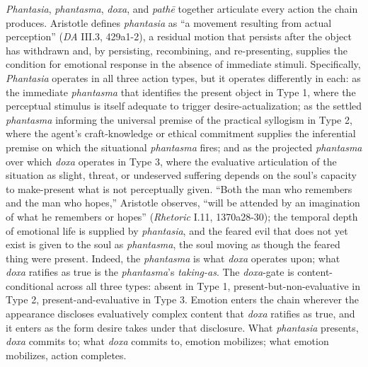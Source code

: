 \documentclass{article}
\begin{document}
\textit{Phantasia}, \textit{phantasma}, \textit{doxa}, and \textit{pathē} together articulate every action the chain produces. Aristotle defines \textit{phantasia} as ``a movement resulting from actual perception'' (\textit{DA} III.3, 429a1-2), a residual motion that persists after the object has withdrawn and, by persisting, recombining, and re-presenting, supplies the condition for emotional response in the absence of immediate stimuli. Specifically, \textit{Phantasia} operates in all three action types, but it operates differently in each: as the immediate \textit{phantasma} that identifies the present object in Type 1, where the perceptual stimulus is itself adequate to trigger desire-actualization; as the settled \textit{phantasma} informing the universal premise of the practical syllogism in Type 2, where the agent's craft-knowledge or ethical commitment supplies the inferential premise on which the situational \textit{phantasma} fires; and as the projected \textit{phantasma} over which \textit{doxa} operates in Type 3, where the evaluative articulation of the situation as slight, threat, or undeserved suffering depends on the soul's capacity to make-present what is not perceptually given. ``Both the man who remembers and the man who hopes,'' Aristotle observes, ``will be attended by an imagination of what he remembers or hopes'' (\textit{Rhetoric} I.11, 1370a28-30); the temporal depth of emotional life is supplied by \textit{phantasia}, and the feared evil that does not yet exist is given to the soul as \textit{phantasma}, the soul moving as though the feared thing were present. Indeed, the \textit{phantasma} is what \textit{doxa} operates upon; what \textit{doxa} ratifies as true is the \textit{phantasma}'s \textit{taking-as}. The \textit{doxa}-gate is content-conditional across all three types: absent in Type 1, present-but-non-evaluative in Type 2, present-and-evaluative in Type 3. Emotion enters the chain wherever the appearance discloses evaluatively complex content that \textit{doxa} ratifies as true, and it enters as the form desire takes under that disclosure. What \textit{phantasia} presents, \textit{doxa} commits to; what \textit{doxa} commits to, emotion mobilizes; what emotion mobilizes, action completes.
\end{document}
